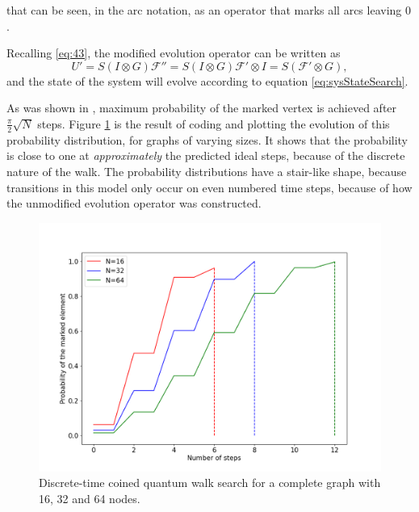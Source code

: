 \documentclass[../../dissertation.tex]{subfiles}
\begin{document}
that can be seen, in the arc notation, as an operator that marks all arcs leaving $0$.\par
Recalling \ref{eq:43}, the modified evolution operator can be written as
\begin{equation}
	U' = S(I \otimes G)\mathcal{F''} = S(I \otimes G)\mathcal{F'} \otimes I = S (\mathcal{F'} \otimes G),\label{modifiedEvoCoined}
\end{equation}
and the state of the system will evolve according to equation \ref{eq:sysStateSearch}.\par
As was shown in \cite{REN1}, maximum probability of the marked vertex is achieved after $\frac{\pi}{2}\sqrt{N}$ steps. Figure \ref{fig:coinedSearch} is the result of coding and plotting the evolution of this probability distribution, for graphs of varying sizes. It shows that the probability is close to one at \textit{approximately} the predicted ideal steps, because of the discrete nature of the walk. The probability distributions have a stair-like shape, because transitions in this model only occur on even numbered time steps, because of how the unmodified evolution operator was constructed.

\begin{figure}[!h]
	\centering
	\includegraphics[scale=0.40]{img/CoinedQuantumWalk/Search/CoinedSearch163264.png}
	\caption{Discrete-time coined quantum walk search for a complete graph with 16, 32 and 64 nodes.}\label{fig:coinedSearch}
\end{figure}
\end{document}
